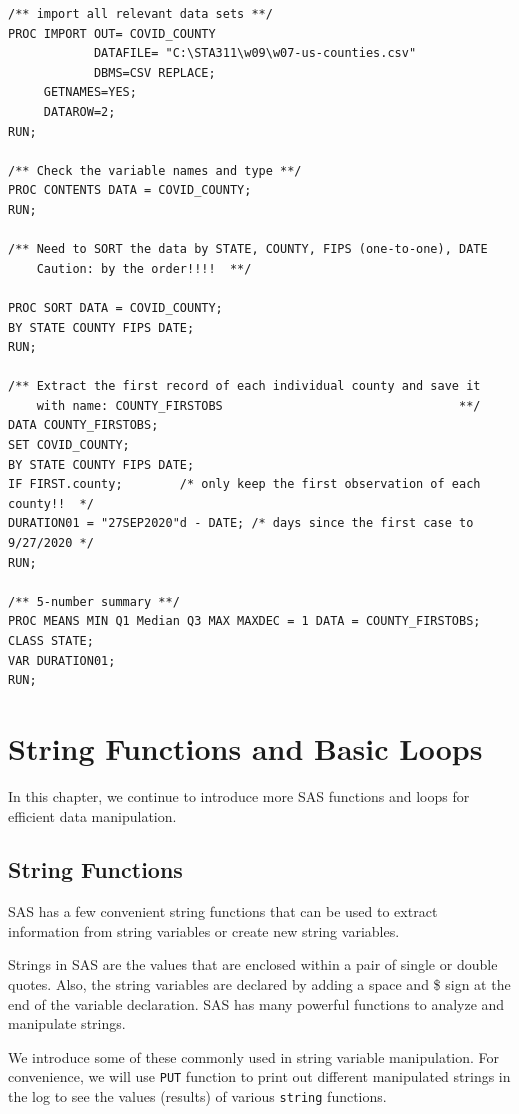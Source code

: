 \documentclass[
]{book}
\begin{document}
\begin{verbatim}
/** import all relevant data sets **/
PROC IMPORT OUT= COVID_COUNTY
            DATAFILE= "C:\STA311\w09\w07-us-counties.csv" 
            DBMS=CSV REPLACE;
     GETNAMES=YES;
     DATAROW=2; 
RUN;

/** Check the variable names and type **/
PROC CONTENTS DATA = COVID_COUNTY;
RUN;

/** Need to SORT the data by STATE, COUNTY, FIPS (one-to-one), DATE 
    Caution: by the order!!!!  **/

PROC SORT DATA = COVID_COUNTY;
BY STATE COUNTY FIPS DATE;
RUN;

/** Extract the first record of each individual county and save it
    with name: COUNTY_FIRSTOBS                                 **/
DATA COUNTY_FIRSTOBS;
SET COVID_COUNTY;
BY STATE COUNTY FIPS DATE;
IF FIRST.county;        /* only keep the first observation of each county!!  */
DURATION01 = "27SEP2020"d - DATE; /* days since the first case to 9/27/2020 */
RUN;

/** 5-number summary **/
PROC MEANS MIN Q1 Median Q3 MAX MAXDEC = 1 DATA = COUNTY_FIRSTOBS;
CLASS STATE;
VAR DURATION01;
RUN;
\end{verbatim}

\hypertarget{string-functions-and-basic-loops}{%
\chapter{String Functions and Basic Loops}\label{string-functions-and-basic-loops}}

In this chapter, we continue to introduce more SAS functions and loops for efficient data manipulation.

\hypertarget{string-functions}{%
\section{String Functions}\label{string-functions}}

SAS has a few convenient string functions that can be used to extract information from string variables or create new string variables.

Strings in SAS are the values that are enclosed within a pair of single or double quotes. Also, the string variables are declared by adding a space and \$ sign at the end of the variable declaration. SAS has many powerful functions to analyze and manipulate strings.

We introduce some of these commonly used in string variable manipulation. For convenience, we will use \texttt{PUT} function to print out different manipulated strings in the log to see the values (results) of various \texttt{string} functions.
\end{document}
